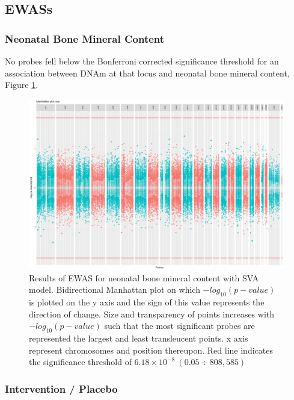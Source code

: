\documentclass[
]{book}
\begin{document}
\hypertarget{ewass}{%
\subsection{EWASs}\label{ewass}}

\hypertarget{neonatal-bone-mineral-content}{%
\subsubsection{Neonatal Bone Mineral Content}\label{neonatal-bone-mineral-content}}

No probes fell below the Bonferroni corrected significance threshold for an association between DNAm at that locus and neonatal bone mineral content, Figure \ref{fig:MAVIDOSbmcEPICewasManhattanSVA}.

\begin{figure}

{\centering \includegraphics[width=0.8\linewidth]{figs/MAVIDOSbmcEPICewasManhattanSVA} 

}

\caption{Results of EWAS for neonatal bone mineral content with SVA model. Bidirectional Manhattan plot on which \(-log_{10}(p-value)\) is plotted on the y axis and the sign of this value represents the direction of change. Size and transparency of points increases with \(-log_{10}(p-value)\) such that the most significant probes are represented the largest and least transleucent points. x axis represent chromosomes and position thereupon. Red line indicates the significance threshold of \(6.18\times10^{-8}~(0.05\div808,585)\)}\label{fig:MAVIDOSbmcEPICewasManhattanSVA}
\end{figure}



\hypertarget{intervention-placebo}{%
\subsubsection{Intervention / Placebo}\label{intervention-placebo}}
\end{document}
